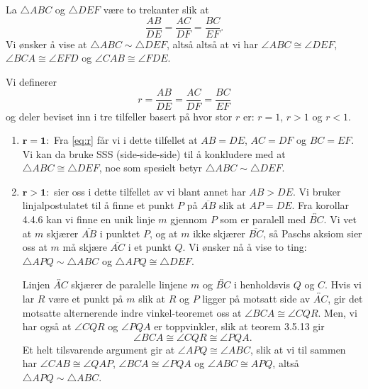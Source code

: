 \begin{oppgave}[5.3.3]
    La $\triangle ABC$ og $\triangle DEF$ være to trekanter slik at 
    $$\frac{AB}{DE}=\frac{AC}{DF}=\frac{BC}{EF}.$$
    Vi ønsker å vise at $\triangle ABC\sim\triangle DEF$, altså altså at vi har $\angle ABC\cong \angle DEF$, $\angle BCA\cong \angle EFD$ og $\angle CAB\cong \angle FDE$. 

    Vi definerer
    \begin{equation}
        \label{eq:r}
        r=\frac{AB}{DE}=\frac{AC}{DF}=\frac{BC}{EF}
    \end{equation}
    og deler beviset inn i tre tilfeller basert på hvor stor $r$ er: $r=1$, $r>1$ og $r<1$. 

    \begin{enumerate}
        \item $\mathbf{r=1:}$ 
        Fra \cref{eq:r} får vi i dette tilfellet at $AB=DE$, $AC=DF$ og $BC=EF$. 
        Vi kan da bruke SSS (side-side-side) til å konkludere med at $\triangle ABC\cong \triangle DEF$, noe som spesielt betyr $\triangle ABC\sim \triangle DEF$. 
        
        \item $\mathbf{r>1:}$
         sier oss i dette tilfellet av vi blant annet har $AB>DE$. 
        Vi bruker linjalpostulatet til å finne et punkt $P$ på $\overline{AB}$ slik at $AP=DE$.
        Fra korollar 4.4.6 kan vi finne en unik linje $m$ gjennom $P$ som er paralell med $\overleftrightarrow{BC}$. 
        Vi vet at $m$ skjærer $\overline{AB}$ i punktet $P$, og at $m$ ikke skjærer $\overline{BC}$, så Paschs aksiom sier oss at $m$ må skjære $\overline{AC}$ i et punkt $Q$. 
        Vi ønsker nå å vise to ting: $\triangle APQ\sim \triangle ABC$ og $\triangle APQ\cong \triangle DEF$. 

        Linjen $\overleftrightarrow{AC}$ skjærer de paralelle linjene $m$ og $\overleftrightarrow{BC}$ i henholdsvis $Q$ og $C$. 
        Hvis vi lar $R$ være et punkt på $m$ slik at $R$ og $P$ ligger på motsatt side av $\overleftrightarrow{AC}$, gir det motsatte alternerende indre vinkel-teoremet oss at $\angle BCA\cong \angle CQR$. 
        Men, vi har også at $\angle CQR$ og $\angle PQA$ er toppvinkler, slik at teorem 3.5.13 gir 
        $$\angle BCA\cong \angle CQR \cong \angle PQA.$$
        Et helt tilsvarende argument gir at $\angle APQ\cong \angle ABC$, slik at vi til sammen har $\angle CAB\cong \angle QAP$, $\angle BCA\cong \angle PQA$ og $\angle ABC\cong APQ$, altså $\triangle APQ\sim\triangle ABC$. 


\end{enumerate}
\end{oppgave}
